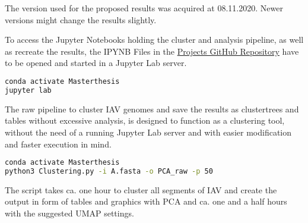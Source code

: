 The version used for the proposed results was acquired at 08.11.2020. Newer versions might change the results slightly.

To access the Jupyter Notebooks holding the cluster and analysis pipeline, as well as recreate the results, the IPYNB Files in the \href{https://github.com/ahenoch/Masterthesis.git}{Projects GitHub Repository} have to be opened and started in a Jupyter Lab server.

\begin{lstlisting}[language=sh]
conda activate Masterthesis
jupyter lab
\end{lstlisting}  

The raw pipeline to cluster \gls{IAV} genomes and save the results as clustertrees and tables without excessive analysis, is designed to function as a clustering tool, without the need of a running Jupyter Lab server and with easier modification and faster execution in mind.

\begin{lstlisting}[language=sh]
conda activate Masterthesis
python3 Clustering.py -i A.fasta -o PCA_raw -p 50
\end{lstlisting}  

The script takes ca. one hour to cluster all segments of \gls{IAV} and create the output in form of tables and graphics with \gls{PCA} and ca. one and a half hours with the suggested \gls{UMAP} settings.

